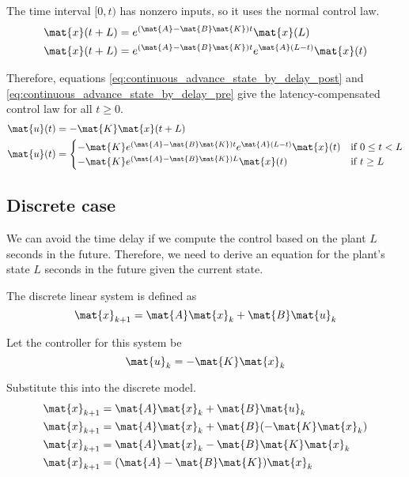 The time interval $[0, t)$ has nonzero inputs, so it uses the normal control
law.
\begin{align}
  \mat{x}(t + L) &= e^{(\mat{A} - \mat{B}\mat{K})t} \mat{x}(L) \nonumber \\
  \mat{x}(t + L) &= e^{(\mat{A} - \mat{B}\mat{K})t} e^{\mat{A}(L - t)}
    \mat{x}(t) \label{eq:continuous_advance_state_by_delay_pre}
\end{align}

Therefore, equations \eqref{eq:continuous_advance_state_by_delay_post} and
\eqref{eq:continuous_advance_state_by_delay_pre} give the latency-compensated
control law for all $t \geq 0$.
\begin{align}
  \mat{u}(t) &= -\mat{K} \mat{x}(t + L) \nonumber \\
  \mat{u}(t) &=
  \begin{cases}
    -\mat{K} e^{(\mat{A} - \mat{B}\mat{K})t} e^{\mat{A}(L - t)} \mat{x}(t) &
      \text{if } 0 \leq t < L \\
    -\mat{K} e^{(\mat{A} - \mat{B}\mat{K})L} \mat{x}(t) & \text{if } t \geq L
  \end{cases}
\end{align}

\subsection{Discrete case}

We can avoid the time delay if we compute the control based on the plant $L$
seconds in the future. Therefore, we need to derive an equation for the plant's
state $L$ seconds in the future given the current state.

The discrete linear system is defined as
\begin{equation*}
  \mat{x}_{k+1} = \mat{A}\mat{x}_k + \mat{B}\mat{u}_k
\end{equation*}

Let the controller for this system be
\begin{equation*}
  \mat{u}_k = -\mat{K}\mat{x}_k
\end{equation*}

Substitute this into the discrete model.
\begin{align*}
  \mat{x}_{k+1} &= \mat{A}\mat{x}_k + \mat{B}\mat{u}_k \\
  \mat{x}_{k+1} &= \mat{A}\mat{x}_k + \mat{B}(-\mat{K}\mat{x}_k) \\
  \mat{x}_{k+1} &= \mat{A}\mat{x}_k - \mat{B}\mat{K}\mat{x}_k \\
  \mat{x}_{k+1} &= (\mat{A} - \mat{B}\mat{K}) \mat{x}_k
\end{align*}

